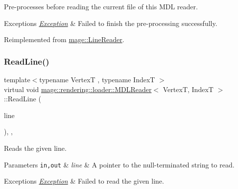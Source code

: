 Pre-\/processes before reading the current file of this M\+DL reader.


\begin{DoxyExceptions}{Exceptions}
{\em \hyperlink{classmage_1_1_exception}{Exception}} & Failed to finish the pre-\/processing successfully. \\
\hline
\end{DoxyExceptions}


Reimplemented from \hyperlink{classmage_1_1_line_reader_a4de135cfb0434be786cfcfd7959031ef}{mage\+::\+Line\+Reader}.

\hypertarget{classmage_1_1rendering_1_1loader_1_1_m_d_l_reader_a121bfa0a48d01bdc37cf09b7f3a25a27}{}\label{classmage_1_1rendering_1_1loader_1_1_m_d_l_reader_a121bfa0a48d01bdc37cf09b7f3a25a27} 
\subsubsection{\texorpdfstring{Read\+Line()}{ReadLine()}}
{\footnotesize\ttfamily template$<$typename VertexT , typename IndexT $>$ \\
virtual void \hyperlink{classmage_1_1rendering_1_1loader_1_1_m_d_l_reader}{mage\+::rendering\+::loader\+::\+M\+D\+L\+Reader}$<$ VertexT, IndexT $>$\+::Read\+Line (\begin{DoxyParamCaption}\item[{\hyperlink{namespacemage_a8769f9d670d6b585ea306cb1062af94b}{Not\+Null}$<$ \hyperlink{namespacemage_a4163ec9a9a27d5e7f4b452dcb99cb2b9}{zstring} $>$}]{line }\end{DoxyParamCaption})\hspace{0.3cm}{\ttfamily [override]}, {\ttfamily [private]}, {\ttfamily [virtual]}}

Reads the given line.


\begin{DoxyParams}[1]{Parameters}
\mbox{\tt in,out}  & {\em line} & A pointer to the null-\/terminated string to read. \\
\hline
\end{DoxyParams}

\begin{DoxyExceptions}{Exceptions}
{\em \hyperlink{classmage_1_1_exception}{Exception}} & Failed to read the given line. \\
\hline
\end{DoxyExceptions}


